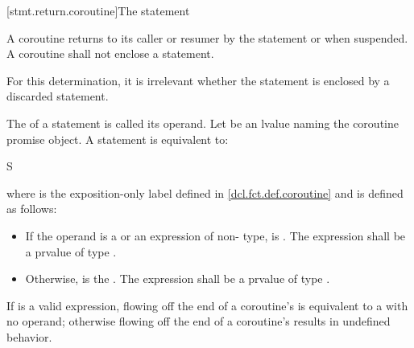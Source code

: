 [stmt.return.coroutine]{The  statement}%
%
%

\begin{bnf}
\br
      \terminal{;}
\end{bnf}

\pnum
A coroutine returns to its caller or resumer
by the  statement or when suspended.
A coroutine shall not enclose
a  statement.
\begin{note}
For this determination, it is irrelevant whether the  statement
is enclosed by a discarded statement.
\end{note}

\pnum
The  of a  statement is
called its operand.
Let  be an lvalue naming the coroutine
promise object.
A  statement is equivalent to:
\begin{ncsimplebnf}
\terminal{\{} S\terminal{;}  \terminal{;} \terminal{\}}
\end{ncsimplebnf}
where  is the exposition-only label
defined in \ref{dcl.fct.def.coroutine}
and  is defined as follows:
\begin{itemize}
\item
If the operand is a  or an expression of non- type,
 is \tcode{)}.
The expression  shall be a prvalue of type .

\item
Otherwise,
 is the  \tcode{\{}{ } \tcode{;} \tcode{;{ }\}}.
The expression 
shall be a prvalue of type .
\end{itemize}

\pnum
If  is a valid expression,
flowing off the end of a coroutine's 
is equivalent to a  with no operand;
otherwise flowing off the end of a coroutine's 
results in undefined behavior.

